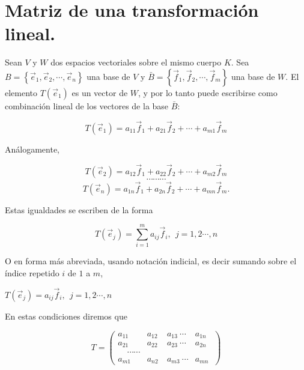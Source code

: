 \bigskip

\section{Matriz  de una transformación  lineal.}
\label{MatrizdeunaTL}


Sean $V$ y $W$ dos espacios vectoriales sobre el mismo cuerpo $K$. Sea $B= \left\{\vec{e}_1,\vec{e}_2,\cdots, \vec{e}_n\right\}$ una base  de $V$ y $\bar{B}= \left\{\vec{f}_1,\vec{f}_2,\cdots, \vec{f}_m\right\}$ una base  de $W$. El elemento $T(\vec{e}_1)$ es un vector de $W$, y por lo tanto puede escribirse como combinación lineal de los vectores de  la base $\bar{B}$:

\bigskip

$$T(\vec{e}_1)=a_{11}\vec{f}_1+a_{21}\vec{f}_2+\cdots + a_{m1}\vec{f}_m$$ 

Análogamente, 

$$T(\vec{e}_2)=a_{12}\vec{f}_1+a_{22}\vec{f}_2+\cdots + a_{m2}\vec{f}_m$$ 
$$  \cdots                \cdots                  \cdots $$
$$T(\vec{e}_n)=a_{1n}\vec{f}_1+a_{2n}\vec{f}_2+\cdots + a_{mn}\vec{f}_m.$$ 

\bigskip



Estas igualdades se escriben de la forma

\bigskip
\begin{equation}
\label{Tej0}
T(\vec{e}_j)=\sum_{i=1}^{m}a_{ij}\vec{f}_i,~~ j=1,2 \cdots,n
\end{equation}

\bigskip
O en forma más abreviada, usando notación indicial, es decir sumando sobre el índice repetido $i$ de $1$ a $m$,


\bigskip

$T(\vec{e}_j)=a_{ij}\vec{f}_i,~~ j=1,2 \cdots,n$

\bigskip

En estas condiciones diremos que 

\bigskip


\bigskip

$$T=\left(\begin{array}{cccc}a_{11} ~&a_{12}  ~& a_{13} ~\cdots &a_{1n}~\\
a_{21} ~&a_{22}  ~& a_{23} ~\cdots &a_{2n}~\\ 
   ~ ~ ~ ~ ~  \cdots \cdots    
\\ a_{m1} ~&a_{n2}  ~& a_{m3} ~\cdots &a_{mn}~                   
\end{array}\right)$$

